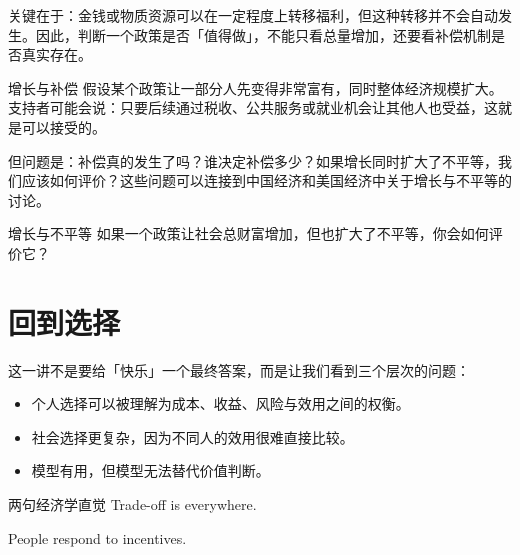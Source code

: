 \documentclass[10pt,a4paper]{ctexart}
\begin{document}
关键在于：金钱或物质资源可以在一定程度上转移福利，但这种转移并不会自动发生。因此，判断一个政策是否「值得做」，不能只看总量增加，还要看补偿机制是否真实存在。

\begin{conceptbox}{增长与补偿}
假设某个政策让一部分人先变得非常富有，同时整体经济规模扩大。支持者可能会说：只要后续通过税收、公共服务或就业机会让其他人也受益，这就是可以接受的。

但问题是：补偿真的发生了吗？谁决定补偿多少？如果增长同时扩大了不平等，我们应该如何评价？这些问题可以连接到中国经济和美国经济中关于增长与不平等的讨论。
\end{conceptbox}

\begin{discussionbox}{增长与不平等}
如果一个政策让社会总财富增加，但也扩大了不平等，你会如何评价它？
\end{discussionbox}

\section{回到选择}

这一讲不是要给「快乐」一个最终答案，而是让我们看到三个层次的问题：

\begin{itemize}
  \item 个人选择可以被理解为成本、收益、风险与效用之间的权衡。
  \item 社会选择更复杂，因为不同人的效用很难直接比较。
  \item 模型有用，但模型无法替代价值判断。
\end{itemize}

\begin{insightbox}{两句经济学直觉}
Trade-off is everywhere.

People respond to incentives.
\end{insightbox}
\end{document}
